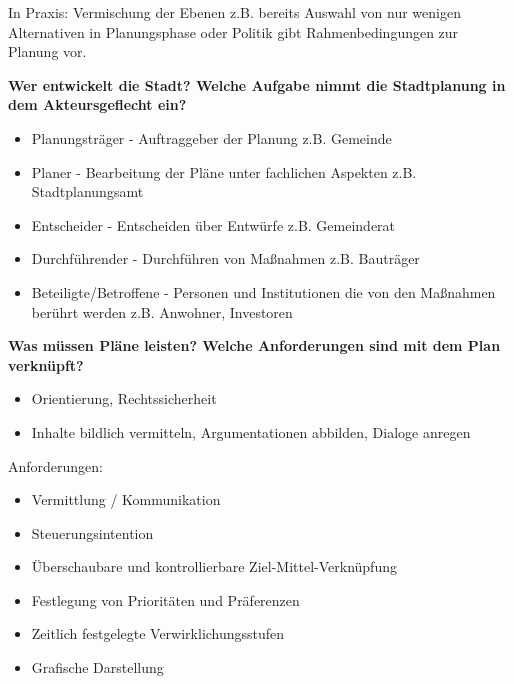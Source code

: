 \documentclass[]{article}
\newenvironment{question}{\vspace{8mm}\noindent\bfseries}{\\}
\begin{document}
In Praxis: Vermischung der Ebenen z.B. bereits Auswahl von nur wenigen Alternativen in Planungsphase oder Politik gibt Rahmenbedingungen zur Planung vor.


\begin{question}
	Wer entwickelt die Stadt? Welche Aufgabe nimmt die Stadtplanung in dem Akteursgeflecht ein?
\end{question}
\begin{itemize}
	\item Planungsträger - Auftraggeber der Planung z.B. Gemeinde
	\item Planer - Bearbeitung der Pläne unter fachlichen Aspekten z.B. Stadtplanungsamt
	\item Entscheider - Entscheiden über Entwürfe z.B. Gemeinderat
	\item Durchführender - Durchführen von Maßnahmen z.B. Bauträger
	\item Beteiligte/Betroffene - Personen und Institutionen die von den Maßnahmen berührt werden z.B. Anwohner, Investoren
\end{itemize}


\begin{question}
	Was müssen Pläne leisten? Welche Anforderungen sind mit dem Plan verknüpft?
\end{question}
\begin{itemize}
	\item Orientierung, Rechtssicherheit
	\item Inhalte bildlich vermitteln, Argumentationen abbilden, Dialoge anregen
\end{itemize}

Anforderungen:
\begin{itemize}
	\item Vermittlung / Kommunikation
	\item Steuerungsintention
	\item Überschaubare und kontrollierbare Ziel-Mittel-Verknüpfung
	\item Festlegung von Prioritäten und Präferenzen
	\item Zeitlich festgelegte Verwirklichungsstufen
	\item Grafische Darstellung
\end{itemize}
\end{document}

